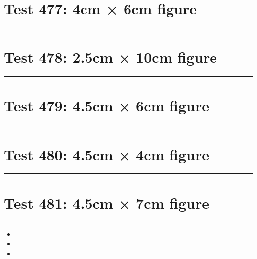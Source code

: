 \documentclass[a4paper,11pt]{article}
\begin{document}
\section*{Test 477: 4cm × 6cm figure}
\begin{swarmwrap}%
  \begin{minipage}[t]{4cm}
    \centering
    \rule{\linewidth}{6cm}
  \end{minipage}%
\end{swarmwrap}%
\swarmwrapnext
\lipsum[66]
\lipsum[67]
\lipsum[68]
\section*{Test 478: 2.5cm × 10cm figure}
\begin{swarmwrap}%
  \begin{minipage}[t]{2cm}
    \centering
    \rule{\linewidth}{10cm}
  \end{minipage}%
\end{swarmwrap}%
\swarmwrapnext
\lipsum[34]
\lipsum[35]
\lipsum[36]
\lipsum[37]
\lipsum[38]
\section*{Test 479: 4.5cm × 6cm figure}
\begin{swarmwrap}%
  \begin{minipage}[t]{4cm}
    \centering
    \rule{\linewidth}{6cm}
  \end{minipage}%
\end{swarmwrap}%
\swarmwrapnext
\lipsum[130]
\lipsum[131]
\lipsum[132]
\section*{Test 480: 4.5cm × 4cm figure}
\begin{swarmwrap}%
  \begin{minipage}[t]{4cm}
    \centering
    \rule{\linewidth}{4cm}
  \end{minipage}%
\end{swarmwrap}%
\swarmwrapnext
\lipsum[45]
\lipsum[46]
\lipsum[47]
\lipsum[48]
\section*{Test 481: 4.5cm × 7cm figure}
\begin{swarmwrap}%
  \begin{minipage}[t]{4cm}
    \centering
    \rule{\linewidth}{7cm}
  \end{minipage}%
\end{swarmwrap}%
\swarmwrapnext
\lipsum[8]
\begin{itemize}
  \item \lipsum[9][1-3]
  \item \lipsum[10][1-3]
  \item \lipsum[11][1-3]
\end{itemize}
\end{document}
